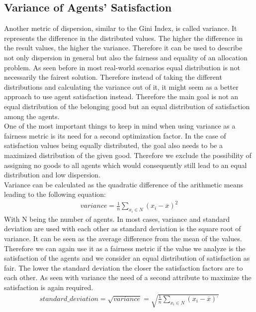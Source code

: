 \documentclass[german, a4paper, 11pt, oneside]{scrbook}
\begin{document}
\subsection{Variance of Agents' Satisfaction}
Another metric of dispersion, similar to the Gini Index, is called variance. It represents the difference in the distributed values. The higher the difference in the result values, the higher the variance. Therefore it can be used to describe not only dispersion in general but also the fairness and equality of an allocation problem. As seen before in most real-world scenarios equal distribution is not necessarily the fairest solution. Therefore instead of taking the different distributions and calculating the variance out of it, it might seem as a better approach to use agent satisfaction instead. Therefore the main goal is not an equal distribution of the belonging good but an equal distribution of satisfaction among the agents. \\One of the most important things to keep in mind when using variance as a fairness metric is its need for a second optimization factor. In the case of satisfaction values being equally distributed, the goal also needs to be a maximized distribution of the given good. Therefore we exclude the possibility of assigning no goods to all agents which would consequently still lead to an equal distribution and low dispersion. \cite{Ek} \\Variance can be calculated as the quadratic difference of the arithmetic means leading to the following equation:
\begin{align}
\mathit{variance}=\frac{1}{n}\sum\limits_{x_i\in N} (x_i-\overline{x})^2
\end{align}\cite{Ek}
With N being the number of agents. In most cases, variance and standard deviation are used with each other as standard deviation is the square root of variance. It can be seen as the average difference from the mean of the values. Therefore we can again use it as a fairness metric if the value we analyze is the satisfaction of the agents and we consider an equal distribution of satisfaction as fair. The lower the standard deviation the closer the satisfaction factors are to each other. As seen with variance the need of a second attribute to maximize the satisfaction is again required.
\begin{align}
\mathit{standard\_deviation}=\sqrt{\mathit{variance}}=\sqrt{\frac{1}{n}\sum\limits_{x_i\in N} (x_i-\overline{x})^.}
\end{align}
\cite{Ek}
\end{document}
